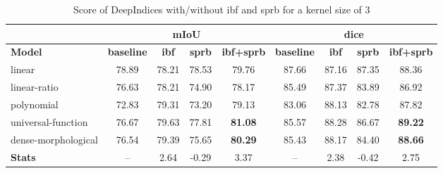 \documentclass[../thesis.tex]{subfiles}
\begin{document}
	\begin{table}[H]
		\centering
		\small
		\begin{tabular} {|l| |c|c|c|c| |c|c|c|c|}
			\hline & \multicolumn{4}{c||}{\textbf{mIoU}} & \multicolumn{4}{|c|}{\textbf{dice}} \\
			\hline \textbf{Model} & \textbf{baseline} &	\textbf{ibf} &	\textbf{sprb} &	\textbf{ibf+sprb}  &
									\textbf{baseline} & \textbf{ibf} &	\textbf{sprb} &	\textbf{ibf+sprb}  \\ \hline
			linear &     78.89 &  78.21 &  78.53 &     79.76 &     87.66 &  87.16 &  87.35 &     88.36 \\
			linear-ratio &     76.63 &  78.21 &  74.90 &     78.17 &     85.49 &  87.37 &  83.89 &     86.92 \\
			polynomial &     72.83 &  79.31 &  73.20 &     79.13 &     83.06 &  88.13 &  82.78 &     87.82 \\
			universal-function &     76.67 &  79.63 &  77.81 &     \textbf{81.08} &     85.57 &  88.28 &  86.67 &     \textbf{89.22} \\
			dense-morphological &     76.54 &  79.39 &  75.65 &     \textbf{80.29} &     85.43 &  88.17 &  84.40 &     \textbf{88.66} \\ \hline
			\textbf{Stats} &       --  &   2.64 &  -0.29 &      3.37 &      --   &   2.38 &  -0.42 &      2.75 \\
			\hline
		\end{tabular}
		\caption{Score of DeepIndices with/without ibf and sprb for a kernel size of 3}
		\label{tab:generic-score-3}
	\end{table}
\end{document}
